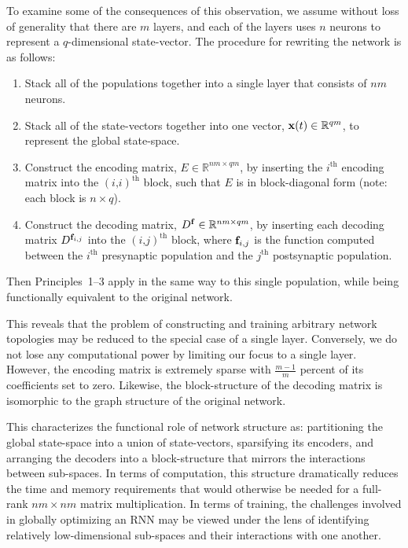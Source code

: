 To examine some of the consequences of this observation, we assume without loss of generality that there are $m$ layers, and each of the layers uses $n$ neurons to represent a $q$-dimensional state-vector.
The procedure for rewriting the network is as follows:
\begin{enumerate}
\item Stack all of the populations together into a single layer that consists of $nm$ neurons. 
\item Stack all of the state-vectors together into one vector, $\mathbf{x}(t) \in \mathbb{R}^{qm}$, to represent the global state-space.
\item Construct the encoding matrix, $E \in \mathbb{R}^{nm \times qm}$, by inserting the $i^\text{th}$ encoding matrix into the $(i\text{,} i)^\text{th}$ block, such that $E$ is in block-diagonal form (note: each block is $n \times q$).
\item Construct the decoding matrix, $D^{\mathbf{f}} \in \mathbb{R}^{nm \times qm}$, by inserting each decoding matrix $D^{\mathbf{f}_{i\text{,}j}}$ into the $(i\text{,} j)^\text{th}$ block, where $\mathbf{f}_{i\text{,}j}$ is the function computed between the $i^\text{th}$ presynaptic population and the $j^\text{th}$ postsynaptic population.
\end{enumerate}
Then Principles~1--3 apply in the same way to this single population, while being functionally equivalent to the original network.

This reveals that the problem of constructing and training arbitrary network topologies may be reduced to the special case of a single layer.
Conversely, we do not lose any computational power by limiting our focus to a single layer.
However, the encoding matrix is extremely sparse with $\frac{m-1}{m}$ percent of its coefficients set to zero.
Likewise, the block-structure of the decoding matrix is isomorphic to the graph structure of the original network.

This characterizes the functional role of network structure as: partitioning the global state-space into a union of state-vectors, sparsifying its encoders, and arranging the decoders into a block-structure that mirrors the interactions between sub-spaces.
In terms of computation, this structure dramatically reduces the time and memory requirements that would otherwise be needed for a full-rank $nm \times nm$ matrix multiplication.
In terms of training, the challenges involved in globally optimizing an RNN may be viewed under the lens of identifying relatively low-dimensional sub-spaces and their interactions with one another.

